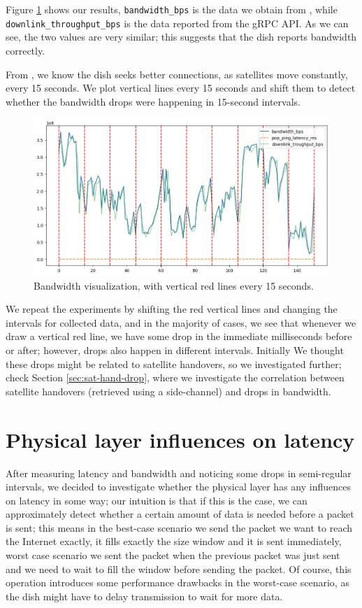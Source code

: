 \documentclass[IN,11pt,twoside,openright,idp,english]{tumthesis}
\begin{document}
Figure \ref{fig:vis-bw-15sec} shows our results, \texttt{bandwidth\_bps} is the data we obtain from , while \texttt{downlink\_throughput\_bps} is the data reported from the gRPC API. As we can see, the two values are very similar; this suggests that the dish reports bandwidth correctly.

From \cite{llc-application}, we know the dish seeks better connections, as satellites move constantly, every 15 seconds. We plot vertical lines every 15 seconds and shift them to detect whether the bandwidth drops were happening in 15-second intervals.

\begin{figure}
    \centering
    \includegraphics[width=1.0\columnwidth]{img/bw-15seconds.png}
    \caption{Bandwidth visualization, with vertical red lines every 15 seconds.}
    \label{fig:vis-bw-15sec}
\end{figure}

We repeat the experiments by shifting the red vertical lines and changing the intervals for collected data, and in the majority of cases, we see that whenever we draw a vertical red line, we have some drop in the immediate milliseconds before or after; however, drops also happen in different intervals. Initially We thought these drops might be related to satellite handovers, so we investigated further; check Section \ref{sec:sat-hand-drop}, where we investigate the correlation between satellite handovers (retrieved using a side-channel) and drops in bandwidth. 

\section{Physical layer influences on latency}

After measuring latency and bandwidth and noticing some drops in semi-regular intervals, we decided to investigate whether the physical layer has any influences on latency in some way; our intuition is that if this is the case, we can approximately detect whether a certain amount of data is needed before a packet is sent; this means in the best-case scenario we send the packet we want to reach the Internet exactly, it fills exactly the size window and it is sent immediately, worst case scenario we sent the packet when the previous packet was just sent and we need to wait to fill the window before sending the packet. Of course, this operation introduces some performance drawbacks in the worst-case scenario, as the dish might have to delay transmission to wait for more data.
\end{document}
